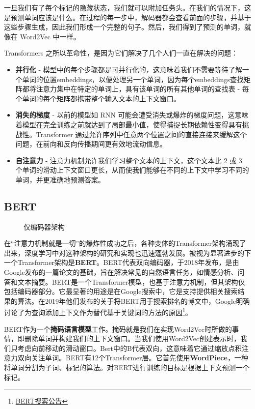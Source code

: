 \documentclass[Chinese, 11pt, table]{diazessay} %
\begin{document}
\begin{CJK}{UTF8}{gbsn}
\begin{sloppypar}
一旦我们有了每个标记的隐藏状态，我们就可以附加任务头。在我们的情况下，这是预测单词应该是什么。在过程的每一步中，解码器都会查看前面的步骤，并基于这些步骤生成，因此我们形成一个完整的句子。然后，我们得到了预测的单词，就像在 Word2Vec 中一样。

Transformers 之所以革命性，是因为它们解决了几个人们一直在解决的问题：
\begin{itemize}
\item \textbf{并行化} - 模型中的每个步骤都是可并行化的，这意味着我们不需要等待了解一个单词的位置embeddings，以便处理另一个单词，因为每个embeddings查找矩阵都将注意力集中在特定的单词上，具有该单词的所有其他单词的查找表 - 每个单词的每个矩阵都携带整个输入文本的上下文窗口。
\item \textbf{消失的梯度} - 以前的模型如 RNN 可能会遭受消失或爆炸的梯度问题，这意味着模型在完全训练之前就达到了局部最小值，使得捕捉长期依赖性变得具有挑战性。Transformer 通过允许序列中任意两个位置之间的直接连接来缓解这个问题，在前向和反向传播期间更有效地流动信息。
\item \textbf{自注意力} - 注意力机制允许我们学习整个文本的上下文，这个文本比 2 或 3 个单词的滑动上下文窗口更长，从而使我们能够在不同的上下文中学习不同的单词，并更准确地预测答案。
\end{itemize}

\subsection{BERT}

\begin{figure}[H]
\caption{仅编码器架构}
\end{figure}

在“注意力机制就是一切”的爆炸性成功之后，各种变体的Transformer架构涌现了出来，深度学习中对这种架构的研究和实现也迅速蓬勃发展。被视为显著进步的下一个Transformer架构是\textbf{BERT}。BERT代表双向编码器，于2018年发布\citep{devlin2018bert}，是由Google发布的一篇论文的基础，旨在解决常见的自然语言任务，如情感分析、问答和文本摘要。BERT是一个Transformer模型，也基于注意力机制，但其架构仅包括编码器部分。它最显著的用途是在Google搜索中，它是支持提供相关搜索结果的算法。在2019年他们发布的关于将BERT用于搜索排名的博文中，Google明确讨论了为查询添加上下文作为替代基于关键词的方法的原因\footnote{\href{https://blog.google/products/search/search-language-understanding-bert/}{BERT搜索公告}}。

BERT作为一个\textbf{掩码语言模型}工作。掩码就是我们在实现Word2Vec时所做的事情，即删除单词并构建我们的上下文窗口。当我们使用Word2Vec创建表示时，我们只考虑向前移动的滑动窗口。Bert中的B代表双向，这意味着它通过缩放点积注意力双向关注单词。BERT有12个Transformer层。它首先使用\textbf{WordPiece}，一种将单词分割为子词、标记的算法。对BERT进行训练的目标是根据上下文预测一个标记。


\end{sloppypar}
\end{CJK}
\end{document}
